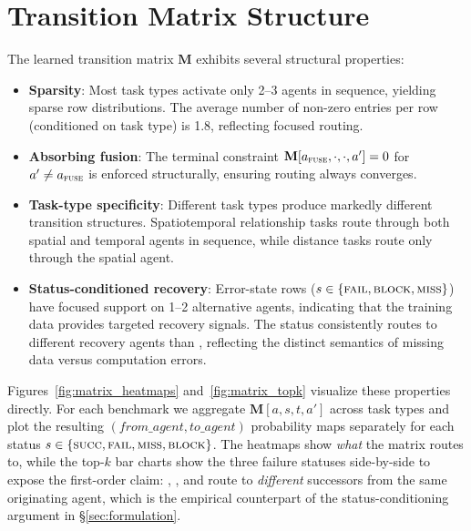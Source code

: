 \section{Transition Matrix Structure}
\label{app:matrix}

The learned transition matrix $\mathbf{M}$ exhibits several structural properties:

\begin{itemize}
    \item \textbf{Sparsity}: Most task types activate only 2--3 agents in sequence, yielding sparse row distributions.  The average number of non-zero entries per row (conditioned on task type) is 1.8, reflecting focused routing.

    \item \textbf{Absorbing fusion}: The terminal constraint $\mathbf{M}[a_{\textnormal{\textsc{fuse}}}, \cdot, \cdot, a'] = 0$ for $a' \neq a_{\textnormal{\textsc{fuse}}}$ is enforced structurally, ensuring routing always converges.

    \item \textbf{Task-type specificity}: Different task types produce markedly different transition structures.  Spatiotemporal relationship tasks route through both spatial and temporal agents in sequence, while distance tasks route only through the spatial agent.

    \item \textbf{Status-conditioned recovery}: Error-state rows ($s \in \{\textnormal{\textsc{fail}}, \textnormal{\textsc{block}}, \textnormal{\textsc{miss}}\}$) have focused support on 1--2 alternative agents, indicating that the training data provides targeted recovery signals.  The \smiss status consistently routes to different recovery agents than \sfail, reflecting the distinct semantics of missing data versus computation errors.
\end{itemize}

Figures~\ref{fig:matrix_heatmaps} and~\ref{fig:matrix_topk} visualize these properties directly.
For each benchmark we aggregate $\mathbf{M}[a, s, t, a']$ across task types and plot the resulting $(\textit{from\_agent}, \textit{to\_agent})$ probability maps separately for each status $s \in \{\textnormal{\textsc{succ}}, \textnormal{\textsc{fail}}, \textnormal{\textsc{miss}}, \textnormal{\textsc{block}}\}$.
The heatmaps show \emph{what} the matrix routes to, while the top-$k$ bar charts show the three failure statuses side-by-side to expose the first-order claim: \sfail, \smiss, and \sblock route to \emph{different} successors from the same originating agent, which is the empirical counterpart of the status-conditioning argument in \S\ref{sec:formulation}.

